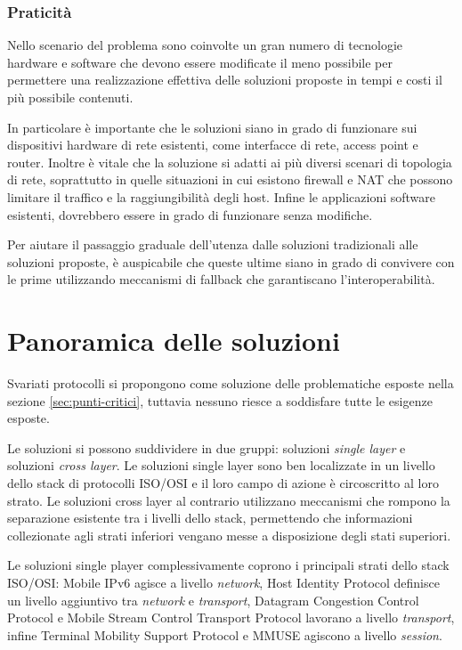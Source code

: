 \documentclass[12pt,a4paper,openright,twoside]{book}
\begin{document}
\subsection{Praticità}
\label{sec:praticita}
Nello scenario del problema sono coinvolte un gran numero di
tecnologie hardware e software che devono essere modificate il meno
possibile per permettere una realizzazione effettiva delle soluzioni
proposte in tempi e costi il più possibile contenuti.

In particolare è importante che le soluzioni siano in grado di
funzionare sui dispositivi hardware di rete esistenti, come interfacce
di rete, access point e router. Inoltre è vitale che la soluzione si
adatti ai più diversi scenari di topologia di rete, soprattutto in
quelle situazioni in cui esistono firewall e NAT che possono limitare
il traffico e la raggiungibilità degli host. Infine le applicazioni
software esistenti, dovrebbero essere in grado di funzionare senza
modifiche.

Per aiutare il passaggio graduale dell'utenza dalle soluzioni
tradizionali alle soluzioni proposte, è auspicabile che queste ultime
siano in grado di convivere con le prime utilizzando meccanismi di
fallback che garantiscano l'interoperabilità.

\clearpage{\pagestyle{empty}\cleardoublepage}

\chapter{Panoramica delle soluzioni}
\lhead[\fancyplain{}{\bfseries\thepage}]{\fancyplain{}{\bfseries\rightmark}}

Svariati protocolli si propongono come soluzione delle problematiche
esposte nella sezione \ref{sec:punti-critici}, tuttavia nessuno riesce
a soddisfare tutte le esigenze esposte.

Le soluzioni si possono suddividere in due gruppi: soluzioni
\emph{single layer} e soluzioni \emph{cross layer}. Le soluzioni
single layer sono ben localizzate in un livello dello stack di
protocolli ISO/OSI e il loro campo di azione è circoscritto al loro
strato. Le soluzioni cross layer al contrario utilizzano meccanismi
che rompono la separazione esistente tra i livelli dello stack,
permettendo che informazioni collezionate agli strati inferiori
vengano messe a disposizione degli stati superiori.

Le soluzioni single player complessivamente coprono i principali
strati dello stack ISO/OSI: Mobile IPv6 \cite{bib:mipv6} agisce a
livello \emph{network}, Host Identity Protocol \cite{bib:hip}
definisce un livello aggiuntivo tra \emph{network} e \emph{transport},
Datagram Congestion Control Protocol \cite{bib:dccp} e Mobile Stream
Control Transport Protocol lavorano a livello \emph{transport}, infine
Terminal Mobility Support Protocol e MMUSE agiscono a livello
\emph{session}.
\end{document}
